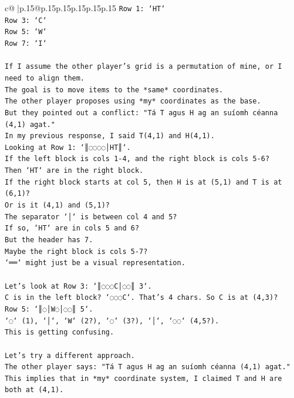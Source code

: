 \documentclass{article}
\begin{document}
{\begin{supertabular}{c@{$\;$}|p{.15\linewidth}@{}p{.15\linewidth}p{.15\linewidth}p{.15\linewidth}p{.15\linewidth}p{.15\linewidth}}
{{{\texttt{Row 1: `HT`} \\
\texttt{Row 3: `C`} \\
\texttt{Row 5: `W`} \\
\texttt{Row 7: `I`} \\
\\ 
\texttt{If I assume the other player's grid is a permutation of mine, or I need to align them.} \\
\texttt{The goal is to move items to the *same* coordinates.} \\
\texttt{The other player proposes using *my* coordinates as the base.} \\
\texttt{But they pointed out a conflict: "Tá T agus H ag an suíomh céanna (4,1) agat."} \\
\texttt{In my previous response, I said T(4,1) and H(4,1).} \\
\texttt{Looking at Row 1: `║◌◌◌◌│HT║`.} \\
\texttt{If the left block is cols 1{-}4, and the right block is cols 5{-}6?} \\
\texttt{Then `HT` are in the right block.} \\
\texttt{If the right block starts at col 5, then H is at (5,1) and T is at (6,1)?} \\
\texttt{Or is it (4,1) and (5,1)?} \\
\texttt{The separator `│` is between col 4 and 5?} \\
\texttt{If so, `HT` are in cols 5 and 6?} \\
\texttt{But the header has 7.} \\
\texttt{Maybe the right block is cols 5{-}7?} \\
\texttt{`══` might just be a visual representation.} \\
\\ 
\texttt{Let's look at Row 3: `║◌◌◌C│◌◌║ 3`.} \\
\texttt{C is in the left block? `◌◌◌C`. That's 4 chars. So C is at (4,3)?} \\
\texttt{Row 5: `║◌│W◌│◌◌║ 5`.} \\
\texttt{`◌` (1), `│`, `W` (2?), `◌` (3?), `│`, `◌◌` (4,5?).} \\
\texttt{This is getting confusing.} \\
\\ 
\texttt{Let's try a different approach.} \\
\texttt{The other player says: "Tá T agus H ag an suíomh céanna (4,1) agat."} \\
\texttt{This implies that in *my* coordinate system, I claimed T and H are both at (4,1).} \\
}}}
\end{supertabular}}
\end{document}

